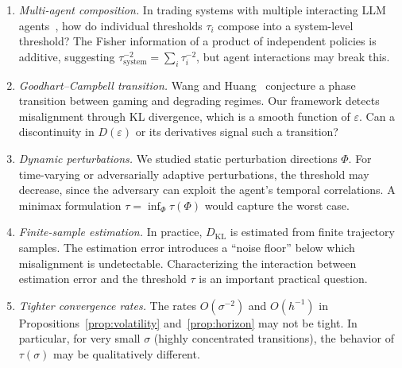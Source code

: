 \begin{enumerate}[label=(\roman*)]
\item \emph{Multi-agent composition.} In trading systems with multiple
  interacting LLM agents~\cite{xiao2024tradingagents}, how do individual
  thresholds $\tau_i$ compose into a system-level threshold? The Fisher
  information of a product of independent policies is additive, suggesting
  $\tau_{\mathrm{system}}^{-2} = \sum_i \tau_i^{-2}$, but agent
  interactions may break this.

\item \emph{Goodhart--Campbell transition.} Wang and
  Huang~\cite{wang2026reward} conjecture a phase transition between gaming
  and degrading regimes. Our framework detects misalignment through KL
  divergence, which is a smooth function of $\varepsilon$. Can a
  discontinuity in $D(\varepsilon)$ or its derivatives signal such a
  transition?

\item \emph{Dynamic perturbations.} We studied static perturbation
  directions $\Phi$. For time-varying or adversarially adaptive
  perturbations, the threshold may decrease, since the adversary can
  exploit the agent's temporal correlations. A minimax formulation
  $\tau = \inf_\Phi \tau(\Phi)$ would capture the worst case.

\item \emph{Finite-sample estimation.} In practice, $D_{\mathrm{KL}}$ is
  estimated from finite trajectory samples. The estimation error introduces
  a ``noise floor'' below which misalignment is undetectable. Characterizing
  the interaction between estimation error and the threshold $\tau$ is an
  important practical question.

\item \emph{Tighter convergence rates.} The rates $O(\sigma^{-2})$ and
  $O(h^{-1})$ in Propositions~\ref{prop:volatility} and~\ref{prop:horizon}
  may not be tight. In particular, for very small $\sigma$ (highly
  concentrated transitions), the behavior of $\tau(\sigma)$ may be
  qualitatively different.
\end{enumerate}
